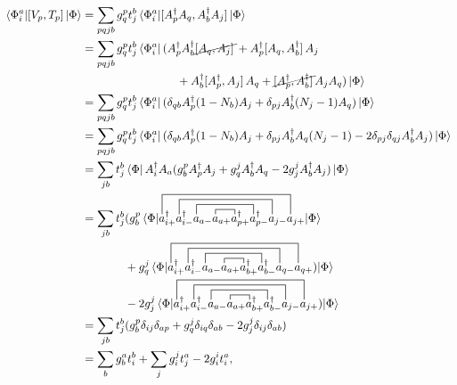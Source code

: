 \documentclass[Dual]{msu-thesis}
\begin{document}
\begin{align}
\mel*{\Phi^a_i}{\comm*{V_p}{T_p}}{\Phi}
&=
\sum_{pqjb}g^p_qt^b_j\mel*{\Phi^a_i}{\comm*{A^\dagger_pA_q}{A^\dagger_bA_j}}{\Phi}
\nonumber
\\
&=
\sum_{pqjb}g^p_qt^b_j\bra*{\Phi^a_i}(A^\dagger_pA^\dagger_b\cancel{\comm*{A_q}{A_j}}+A^\dagger_p\comm*{A_q}{A^\dagger_b}A_j
\nonumber
\\
&\hspace{28.75mm}+
A^\dagger_b\comm*{A^\dagger_p}{A_j}A_q+\cancel{\comm*{A^\dagger_p}{A^\dagger_b}}A_jA_q)\ket{\Phi}
\nonumber
\\
&=
\sum_{pqjb}g^p_qt^b_j\bra*{\Phi^a_i}(\delta_{qb}A^\dagger_p(1-N_b)A_j+\delta_{pj}A^\dagger_b(N_j-1)A_q)\ket{\Phi}
\nonumber
\\
&=
\sum_{pqjb}g^p_qt^b_j\bra*{\Phi^a_i}(\delta_{qb}A^\dagger_p(1-N_b)A_j+\delta_{pj}A^\dagger_bA_q(N_j-1)-2\delta_{pj}\delta_{qj}A^\dagger_bA_j)\ket{\Phi}
\nonumber
\\
&=
\sum_{jb}t^b_j\bra*{\Phi}A^\dagger_iA_a(g^p_bA^\dagger_pA_j+g^j_qA^\dagger_bA_q-2g^j_jA^\dagger_bA_j)\ket{\Phi}
\nonumber
\\
&=
\sum_{jb}t^b_j(g^p_b
\mel*{\Phi}{
\contraction[1ex]{a^\dagger_{i+}a^\dagger_{i-}a_{a-}}{a}{_{a+}}
{a}
\contraction[2ex]{a^\dagger_{i+}a^\dagger_{i-}}{a}{_{a-}a_{a+}
a^\dagger_{p+}}{a}
\contraction[3ex]{a^\dagger_{i+}}{a}{^\dagger_{i-}a_{a-}a_{a+}
a^\dagger_{p+}a^\dagger_{p-}}{a}
\contraction[4ex]{}{a}{^\dagger_{i+}a^\dagger_{i-}a_{a-}a_{a+}
a^\dagger_{p+}a^\dagger_{p-}a_{j-}}{a}
a^\dagger_{i+}a^\dagger_{i-}a_{a-}a_{a+}a^\dagger_{p+}a^\dagger_{p-}a_{j-}a_{j+}
}{\Phi}
\nonumber
\\
&\hspace{13mm}+
g^j_q
\mel*{\Phi}{
\contraction[1ex]{a^\dagger_{i+}a^\dagger_{i-}a_{a-}}{a}{_{a+}}
{a}
\contraction[2ex]{a^\dagger_{i+}a^\dagger_{i-}}{a}{_{a-}a_{a+}
a^\dagger_{b+}}{a}
\contraction[3ex]{a^\dagger_{i+}}{a}{^\dagger_{i-}a_{a-}a_{a+}
a^\dagger_{b+}a^\dagger_{b-}}{a}
\contraction[4ex]{}{a}{^\dagger_{i+}a^\dagger_{i-}a_{a-}a_{a+}
a^\dagger_{b+}a^\dagger_{b-}a_{q-}}{a}
a^\dagger_{i+}a^\dagger_{i-}a_{a-}a_{a+}a^\dagger_{b+}a^\dagger_{b-}a_{q-}a_{q+}
)}{\Phi}
\nonumber
\\
&\hspace{13mm}-2
g^j_j
\mel*{\Phi}{
\contraction[1ex]{a^\dagger_{i+}a^\dagger_{i-}a_{a-}}{a}{_{a+}}
{a}
\contraction[2ex]{a^\dagger_{i+}a^\dagger_{i-}}{a}{_{a-}a_{a+}
a^\dagger_{b+}}{a}
\contraction[3ex]{a^\dagger_{i+}}{a}{^\dagger_{i-}a_{a-}a_{a+}
a^\dagger_{b+}a^\dagger_{b-}}{a}
\contraction[4ex]{}{a}{^\dagger_{i+}a^\dagger_{i-}a_{a-}a_{a+}
a^\dagger_{b+}a^\dagger_{b-}a_{q-}}{a}
a^\dagger_{i+}a^\dagger_{i-}a_{a-}a_{a+}a^\dagger_{b+}a^\dagger_{b-}a_{j-}a_{j+}
)}{\Phi}
\nonumber
\\
&=
\sum_{jb}t^b_j(g^p_b\delta_{ij}\delta_{ap}+g^j_q\delta_{iq}\delta_{ab}-2g^j_j\delta_{ij}\delta_{ab})
\nonumber
\\
&=
\sum_bg^a_bt^b_i+\sum_jg^j_it^a_j-2g^i_it^a_i
,\end{align}
\end{document}
